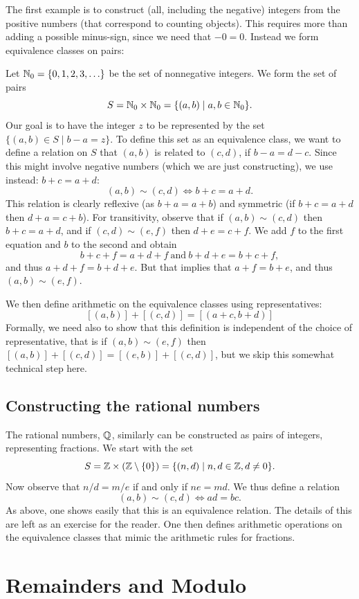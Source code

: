 The first example is to construct (all, including the negative) integers
from the positive numbers (that correspond to counting objects). This
requires more than adding a possible minus-sign, since we need that $-0=0$.
Instead we form equivalence classes on pairs:

Let ${\mathbb N}_0=\{0,1,2,3,\ldots\}$ be the set of nonnegative integers. We form
the set of pairs
\[
S={\mathbb N}_0\times{\mathbb N}_0=\{(a,b)\mid a,b\in{\mathbb N}_0\}.
\]
Our goal is to have the integer $z$ to be represented by the set
$\{(a,b)\in S\mid b-a=z\}$. To define this set as an equivalence class, we
want to define a relation on $S$ that $(a,b)$ is related to
$(c,d)$, if $b-a=d-c$. Since this might involve negative numbers (which we
are just constructing), we use instead: $b+c=a+d$:
\[
(a,b)\sim(c,d)\Leftrightarrow b+c=a+d.
\]
This relation is clearly reflexive (as $b+a=a+b$) and symmetric (if
$b+c=a+d$ then $d+a=c+b$). For transitivity, observe that if
$(a,b)\sim(c,d)$ then $b+c=a+d$, and if $(c,d)\sim(e,f)$ then $d+e=c+f$. We
add $f$ to the first equation and $b$ to the second and obtain
\[
b+c+f=a+d+f\ \mbox{and}\ b+d+e=b+c+f,
\]
and thus $a+d+f=b+d+e$. But that implies that $a+f=b+e$, and thus
$(a,b)\sim(e,f)$.

We then define arithmetic on the equivalence classes using representatives:
\[
[(a,b)]+[(c,d)]=[(a+c,b+d)]
\]
Formally, we need also to show that this definition is independent of the
choice of representative, that is if $(a,b)\sim(e,f)$ then
$[(a,b)]+[(c,d)]=[(e,b)]+[(c,d)]$, but we skip this somewhat technical step
here.
\bigskip

\subsection{Constructing the rational numbers}

The rational numbers, ${\mathbb Q}$, similarly can be constructed as pairs of
integers,
representing fractions. We start with the set
\[
S={\mathbb Z}\times ({\mathbb Z}\setminus\{0\})=\{(n,d)\mid n,d\in{\mathbb Z},d\not=0\}.
\]
Now observe that $n/d=m/e$ if and only if $ne=md$. We thus define a relation
\[
(a,b)\sim(c,d)\Leftrightarrow ad=bc.
\]
As above, one shows easily that this is an equivalence relation. The details
of this are left as an exercise for the reader. One then
defines arithmetic operations on the equivalence classes that mimic the
arithmetic rules for fractions.

\section{Remainders and Modulo}

